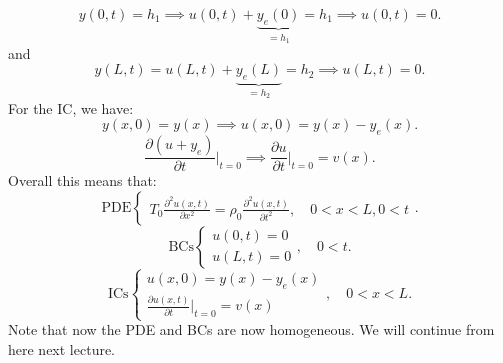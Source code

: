 \documentclass[../main/main.tex]{subfiles}
\begin{document}
\begin{enumerate}
\[y(0,t) = h_1 \implies u(0,t) + \underbrace{y_e(0)}_{=h_1} = h_1 \implies u(0,t) = 0
.\] and \[
y(L,t) = u(L,t) + \underbrace{y_e(L)}_{=h_2} = h_2 \implies u(L,t) = 0
.\] For the IC, we have: \[
y(x,0) = y(x) \implies u(x,0) = y(x) -y_e(x)
.\]  \[
\frac{\partial (u+y_e)}{\partial t}\bigg\rvert_{t=0} \implies \frac{\partial u}{\partial t} \bigg\rvert_{t=0} = v(x) 
.\] Overall this means that: \[
\text{PDE} \begin{cases}
	T_0 \frac{\partial ^2 u(x,t)}{\partial x^2} = \rho_0 \frac{\partial ^2 u(x,t)}{\partial t^2} ,\quad 0 < x < L , 0 < t
\end{cases}
.\] \[
\text{BCs} \begin{cases}
	u(0,t) = 0 \\ u(L,t) = 0
\end{cases}, \quad 0 < t
.\] \[
\text{ICs} \begin{cases}
u(x,0) = y(x) - y_e(x) \\ \frac{\partial u(x,t)}{\partial t} \bigg\rvert_{t=0} = v(x)
\end{cases}, \quad 0 < x < L
.\] Note that now the PDE and BCs are now homogeneous. We will continue from here next lecture.
\end{enumerate}
\end{document}
